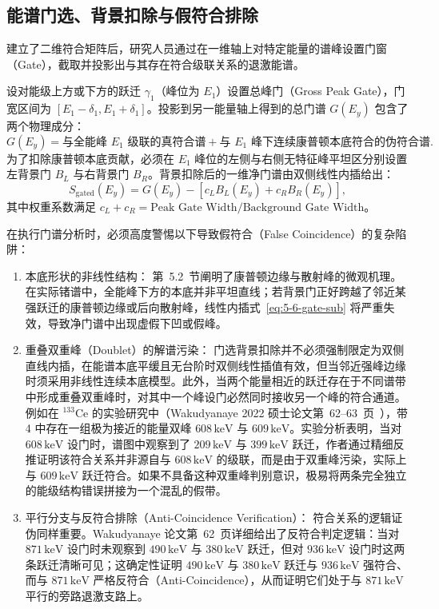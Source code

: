 \subsection{能谱门选、背景扣除与假符合排除}\label{subsec:5-6-4}

建立了二维符合矩阵后，研究人员通过在一维轴上对特定能量的谱峰设置门窗（Gate），截取并投影出与其存在符合级联关系的退激能谱。

设对能级上方或下方的跃迁 $\gamma_1$（峰位为 $E_1$）设置总峰门（Gross Peak Gate），门宽区间为 $[E_1 - \delta_1, E_1 + \delta_1]$。投影到另一能量轴上得到的总门谱 $G(E_y)$ 包含了两个物理成分：
$$
G(E_y) = \text{与全能峰 } E_1 \text{ 级联的真符合谱} + \text{与 } E_1 \text{ 峰下连续康普顿本底符合的伪符合谱}.
$$
为了扣除康普顿本底贡献，必须在 $E_1$ 峰位的左侧与右侧无特征峰平坦区分别设置左背景门 $B_L$ 与右背景门 $B_R$。背景扣除后的一维净门谱由双侧线性内插给出：
\begin{equation}\label{eq:5-6-gate-sub}
S_{\mathrm{gated}}(E_y) = G(E_y) - \left[ c_L B_L(E_y) + c_R B_R(E_y) \right],
\end{equation}
其中权重系数满足 $c_L + c_R = \text{Peak Gate Width} / \text{Background Gate Width}$。

在执行门谱分析时，必须高度警惕以下导致假符合（False Coincidence）的复杂陷阱：
\begin{enumerate}
\item 本底形状的非线性结构：
第~5.2~节阐明了康普顿边缘与散射峰的微观机理。在实际锗谱中，全能峰下方的本底并非平坦直线；若背景门正好跨越了邻近某强跃迁的康普顿边缘或后向散射峰，线性内插式~\eqref{eq:5-6-gate-sub} 将严重失效，导致净门谱中出现虚假下凹或假峰。
\item 重叠双重峰（Doublet）的解谱污染：
门选背景扣除并不必须强制限定为双侧直线内插，在能谱本底平缓且无台阶时双侧线性插值有效，但当邻近强峰边缘时须采用非线性连续本底模型。此外，当两个能量相近的跃迁存在于不同谱带中形成重叠双重峰时，对其中一个峰设门必然同时接收另一个峰的符合通道。
例如在 $^{133}\mathrm{Ce}$ 的实验研究中（Wakudyanaye 2022 硕士论文第~62--63~页~\cite{wakudyanaye-2022-triaxiality-rotational-bands-133ce}），带 4 中存在一组极为接近的能量双峰 $608\,\text{keV}$ 与 $609\,\text{keV}$。实验分析表明，当对 $608\,\text{keV}$ 设门时，谱图中观察到了 $209\,\text{keV}$ 与 $399\,\text{keV}$ 跃迁，作者通过精细反推证明该符合关系并非源自与 $608\,\text{keV}$ 的级联，而是由于双重峰污染，实际上与 $609\,\text{keV}$ 跃迁符合。如果不具备这种双重峰判别意识，极易将两条完全独立的能级结构错误拼接为一个混乱的假带。
\item 平行分支与反符合排除（Anti-Coincidence Verification）：
符合关系的逻辑证伪同样重要。Wakudyanaye 论文第~62~页详细给出了反符合判定逻辑：当对 $871\,\text{keV}$ 设门时未观察到 $490\,\text{keV}$ 与 $380\,\text{keV}$ 跃迁，但对 $936\,\text{keV}$ 设门时这两条跃迁清晰可见；这确定性证明 $490\,\text{keV}$ 与 $380\,\text{keV}$ 跃迁与 $936\,\text{keV}$ 强符合、而与 $871\,\text{keV}$ 严格反符合（Anti-Coincidence），从而证明它们处于与 $871\,\text{keV}$ 平行的旁路退激支路上。
\end{enumerate}

